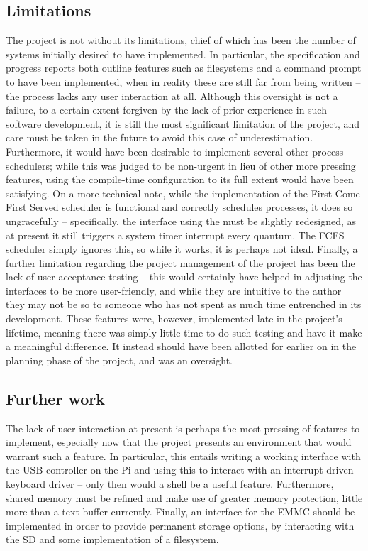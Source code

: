 \subsection{Limitations}
    The project is not without its limitations, chief of which has been the
    number of systems initially desired to have implemented. In particular, the
    specification and progress reports both outline features such as filesystems
    and a command prompt to have been implemented, when in reality these are
    still far from being written -- the process lacks any user interaction at
    all. Although this oversight is not a failure, to a certain extent forgiven
    by the lack of prior experience in such software development, it is still
    the most significant limitation of the project, and care must be taken in
    the future to avoid this case of underestimation.  Furthermore, it would
    have been desirable to implement several other process schedulers; while
    this was judged to be non-urgent in lieu of other more pressing features,
    using the compile-time configuration to its full extent would have been
    satisfying. On a more technical note, while the implementation of the First
    Come First Served scheduler is functional and correctly schedules processes,
    it does so ungracefully -- specifically, the interface using the  must be slightly redesigned, as at present it still
    triggers a system timer interrupt every quantum. The FCFS scheduler simply
    ignores this, so while it works, it is perhaps not ideal. Finally, a further
    limitation regarding the project management of the project has been the lack
    of user-acceptance testing -- this would certainly have helped in adjusting
    the interfaces to be more user-friendly, and while they are intuitive to the
    author they may not be so to someone who has not spent as much time
    entrenched in its development. These features were, however, implemented
    late in the project's lifetime, meaning there was simply little time to do
    such testing and have it make a meaningful difference. It instead should
    have been allotted for earlier on in the planning phase of the project, and
    was an oversight.
    
\subsection{Further work}
    The lack of user-interaction at present is perhaps the most pressing of
    features to implement, especially now that the project presents an
    environment that would warrant such a feature. In particular, this entails
    writing a working interface with the USB controller on the Pi and using this
    to interact with an interrupt-driven keyboard driver -- only then would a
    shell be a useful feature. Furthermore, shared memory must be refined and
    make use of greater memory protection, little more than a text buffer
    currently. Finally, an interface for the EMMC should be implemented in order
    to provide permanent storage options, by interacting with the SD and some
    implementation of a filesystem.
